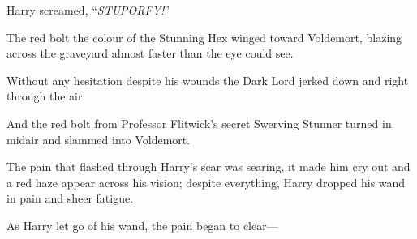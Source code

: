 Harry screamed, “\emph{STUPORFY!}”

The red bolt the colour of the Stunning Hex winged toward Voldemort, blazing across the graveyard almost faster than the eye could see.

Without any hesitation despite his wounds the Dark Lord jerked down and right through the air.

And the red bolt from Professor Flitwick’s secret Swerving Stunner turned in midair and slammed into Voldemort.

The pain that flashed through Harry’s scar was searing, it made him cry out and a red haze appear across his vision; despite everything, Harry dropped his wand in pain and sheer fatigue.

As Harry let go of his wand, the pain began to clear—

